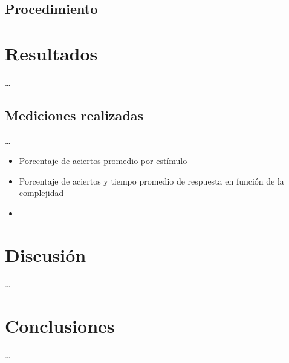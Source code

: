 \documentclass[runningheads,a4paper]{llncs}
\begin{document}
\subsection{Procedimiento}


\section{Resultados}
\ldots

\subsection{Mediciones realizadas}
\ldots
\begin{itemize}
 \item Porcentaje de aciertos promedio por estímulo
 \item Porcentaje de aciertos y tiempo promedio de respuesta en función de la complejidad
 \item 

\end{itemize}


\section{Discusi\'on}
\ldots

\section{Conclusiones}
\ldots


\newpage
\end{document}
